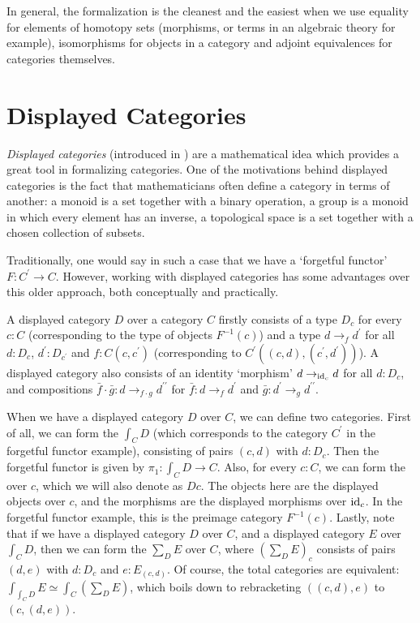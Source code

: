 In general, the formalization is the cleanest and the easiest when we use equality for elements of homotopy sets (morphisms, or terms in an algebraic theory for example), isomorphisms for objects in a category and adjoint equivalences for categories themselves.

\section{Displayed Categories}\label{sec:displayed-categories}

\textit{Displayed categories} (introduced in \autocite{displayed-categories}) are a mathematical idea which provides a great tool in formalizing categories. One of the motivations behind displayed categories is the fact that mathematicians often define a category in terms of another: a monoid is a set together with a binary operation, a group is a monoid in which every element has an inverse, a topological space is a set together with a chosen collection of subsets.

Traditionally, one would say in such a case that we have a `forgetful functor' $ F : C^\prime \to C $. However, working with displayed categories has some advantages over this older approach, both conceptually and practically.

A displayed category $ D $ over a category $ C $ firstly consists of a type $ D_c $ for every $ c : C $ (corresponding to the type of objects $ F^{-1}(c) $) and a type $ d \to_f d^\prime $ for all $ d: D_c $, $ d^\prime : D_{c^\prime} $ and $ f : C(c, c^\prime) $ (corresponding to $ C^\prime((c, d), (c^\prime, d^\prime)) $). A displayed category also consists of an identity `morphism' $ d \to_{\text{id}_{c}} d $ for all $ d : D_c $, and compositions $ \bar f \cdot \bar g : d \to_{f \cdot g} d^{\prime \prime} $ for $ \bar f : d \to_f d^\prime $ and $ \bar g : d^\prime \to_g d^{\prime \prime} $.

When we have a displayed category $ D $ over $ C $, we can define two categories. First of all, we can form the  $ \int_C D $ (which corresponds to the category $ C^\prime $ in the forgetful functor example), consisting of pairs $ (c, d) $ with $ d : D_c $. Then the forgetful functor is given by $ \pi_1 : \int_C D \to C $. Also, for every $ c : C $, we can form the  over $ c $, which we will also denote as $ D c $. The objects here are the displayed objects over $ c $, and the morphisms are the displayed morphisms over $ \text{id}_{c} $. In the forgetful functor example, this is the preimage category $ F^{-1}(c) $. Lastly, note that if we have a displayed category $ D $ over $ C $, and a displayed category $ E $ over $ \int_C D $, then we can form the  $ \sum_D E $ over $ C $, where $ (\sum_D E)_c $ consists of pairs $ (d, e) $ with $ d : D_c $ and $ e : E_{(c, d)} $. Of course, the total categories are equivalent: $ \int_{\int_C D} E \simeq \int_C (\sum_D E) $, which boils down to rebracketing $ ((c, d), e) $ to $ (c, (d, e)) $.

